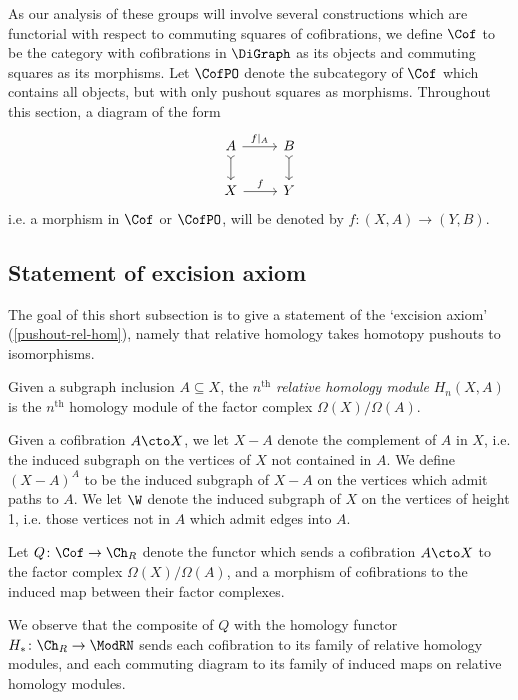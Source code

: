 As our analysis of these groups will involve several constructions which are functorial with respect to commuting squares of cofibrations, we define $\Cof$ to be the category with cofibrations in $\DiGraph$ as its objects and commuting squares as its morphisms. Let $\CofPO$ denote the subcategory of $\Cof$ which contains all objects, but with only pushout squares as morphisms. Throughout this section, a diagram of the form
\[
\begin{tikzcd}
A \arrow[r,"f|_A"] \arrow[d,tail] & B \arrow[d,tail] \\
X \arrow[r,"f"] & Y
\end{tikzcd}
\]
i.e.  a morphism in $\Cof$ or $\CofPO$, will be denoted by $f \colon (X,A) \to (Y,B)$.

\subsection{Statement of excision axiom}

The goal of this short subsection is to give a statement of the `excision axiom' (\cref{pushout-rel-hom}), namely that relative homology takes homotopy pushouts to isomorphisms.

\begin{defi}
Given a subgraph inclusion $A \subseteq X$, the $n^{\mathrm{th}}$ \emph{relative homology module} $H_{n}(X,A)$ is the $n^{\mathrm{th}}$ homology module of the factor complex $\Omega(X) / \Omega(A)$.
\end{defi}

Given a cofibration $A \cto X$, we let $X - A$ denote the complement of $A$ in $X$, i.e.  the induced subgraph on the vertices of $X$ not contained in $A$. We define $(X - A)^A$ to be the induced subgraph of $X - A$ on the vertices which admit paths to $A$. We let $\W$ denote the induced subgraph of $X$ on the vertices of height 1, i.e.  those vertices not in $A$ which admit edges into $A$. 

\begin{defi}
Let $Q \colon \Cof \to \Ch_R$ denote the functor which sends a cofibration $A \cto X$ to the factor complex $\Omega(X)/\Omega(A)$, and a morphism of cofibrations to the induced map between their factor complexes. 
\end{defi}

We observe that the composite of $Q$ with the homology functor $H_* \colon \Ch_R \to \ModRN$ sends each cofibration to its family of relative homology modules, and each commuting diagram to its family of induced maps on relative homology modules.

